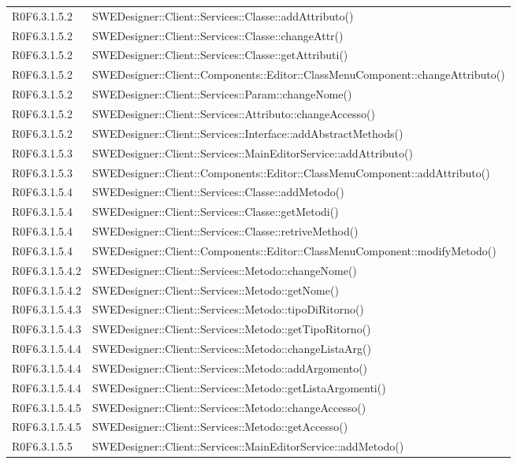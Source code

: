 \begin{center}
\begin{longtable}{p{2cm}!{\VRule[1pt]}p{13cm}}
R0F6.3.1.5.2 & SWEDesigner::Client::Services::Classe::addAttributo()\\
R0F6.3.1.5.2 & SWEDesigner::Client::Services::Classe::changeAttr()\\
R0F6.3.1.5.2 & SWEDesigner::Client::Services::Classe::getAttributi()\\
R0F6.3.1.5.2 & SWEDesigner::Client::Components::Editor::ClassMenuComponent::changeAttributo()\\
R0F6.3.1.5.2 & SWEDesigner::Client::Services::Param::changeNome()\\
R0F6.3.1.5.2 & SWEDesigner::Client::Services::Attributo::changeAccesso()\\
R0F6.3.1.5.2 & SWEDesigner::Client::Services::Interface::addAbstractMethods()\\
R0F6.3.1.5.3 & SWEDesigner::Client::Services::MainEditorService::addAttributo()\\
R0F6.3.1.5.3 & SWEDesigner::Client::Components::Editor::ClassMenuComponent::addAttributo()\\
R0F6.3.1.5.4 & SWEDesigner::Client::Services::Classe::addMetodo()\\
R0F6.3.1.5.4 & SWEDesigner::Client::Services::Classe::getMetodi()\\
R0F6.3.1.5.4 & SWEDesigner::Client::Services::Classe::retriveMethod()\\
R0F6.3.1.5.4 & SWEDesigner::Client::Components::Editor::ClassMenuComponent::modifyMetodo()\\
R0F6.3.1.5.4.2 & SWEDesigner::Client::Services::Metodo::changeNome()\\
R0F6.3.1.5.4.2 & SWEDesigner::Client::Services::Metodo::getNome()\\
R0F6.3.1.5.4.3 & SWEDesigner::Client::Services::Metodo::tipoDiRitorno()\\
R0F6.3.1.5.4.3 & SWEDesigner::Client::Services::Metodo::getTipoRitorno()\\
R0F6.3.1.5.4.4 & SWEDesigner::Client::Services::Metodo::changeListaArg()\\
R0F6.3.1.5.4.4 & SWEDesigner::Client::Services::Metodo::addArgomento()\\
R0F6.3.1.5.4.4 & SWEDesigner::Client::Services::Metodo::getListaArgomenti()\\
R0F6.3.1.5.4.5 & SWEDesigner::Client::Services::Metodo::changeAccesso()\\
R0F6.3.1.5.4.5 & SWEDesigner::Client::Services::Metodo::getAccesso()\\
R0F6.3.1.5.5 & SWEDesigner::Client::Services::MainEditorService::addMetodo()\\

\end{longtable}
\end{center}
